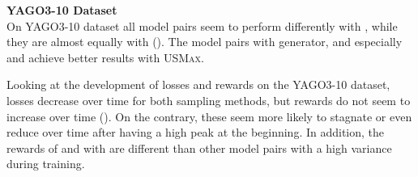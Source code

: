 \textbf{YAGO3-10 Dataset}
\label{subsubsec:methods_yago3_10}\\
%
On \textsc{YAGO3-10} dataset all model pairs seem to perform differently with \usmax, while they are almost equally with \ussoftmax ().
The model pairs with \complex generator, and especially \complex and \transd achieve better results with \textsc{USMax}.

Looking at the development of losses and rewards on the \textsc{YAGO3-10} dataset, losses decrease over time for both sampling methods, but rewards do not seem to increase over time ().
On the contrary, these seem more likely to stagnate or even reduce over time after having a high peak at the beginning.
In addition, the rewards of \distmult and \transd with \usmax are different than other model pairs with a high variance during training.
\clearpage
